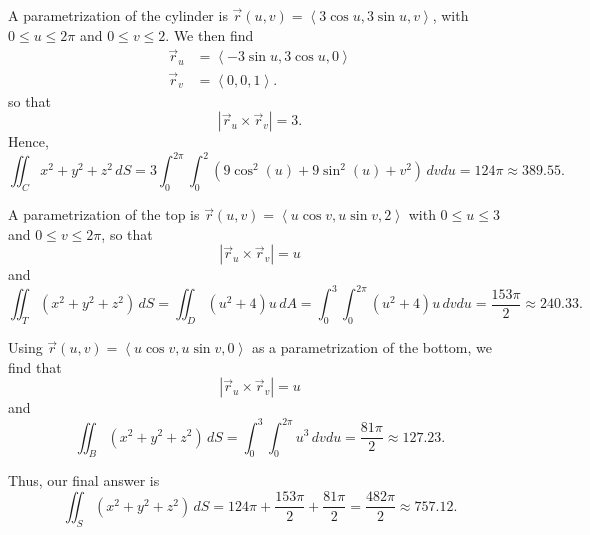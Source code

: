 \documentclass[12pt]{article}
\newcommand{\spc}{\vspace*{0.5cm}}
\begin{document}
	A parametrization of the cylinder is $\vec{r} (u, v ) = \left\langle 3 \cos u , 3 \sin u , v \right\rangle$, with $0 \leq u \leq 2\pi$ and $0 \leq v \leq 2$. We then find
		\begin{align*}
			\vec{r}_u &= \left\langle -3 \sin u , 3 \cos u , 0 \right\rangle \\ 
			\vec{r}_v &= \left\langle 0 , 0 , 1 \right\rangle .
		\end{align*}
	so that
		\[
			|\vec{r}_u \times \vec{r}_v | = 3 .
		\]
	Hence,
		\[
			\iint_C x^2 + y^2 + z^2 \, dS = 3 \int_0^{2\pi} \int_0^2 (9 \cos^2 (u) + 9 \sin^2 (u) + v^2 ) \, dv du = 124 \pi \approx 389.55 .
		\]

	A parametrization of the top is $\vec{r} (u, v) = \left\langle u \cos v , u \sin v , 2 \right\rangle$ with $0 \leq u \leq 3$ and $0 \leq v \leq 2\pi$, so that
		\[
			|\vec{r}_u \times \vec{r}_v| = u
		\]
	and
		\[
			\iint_T (x^2 + y^2 + z^2 ) \, dS = \iint_D (u^2 + 4) u \, dA = \int_0^3 \int_0^{2\pi} (u^2 + 4) u \, dv du = \frac{153 \pi}{2} \approx 240.33 .
		\]

	Using $\vec{r} (u, v) = \left\langle u \cos v , u \sin v , 0 \right\rangle$ as a parametrization of the bottom, we find that
		\[
			|\vec{r}_u \times \vec{r}_v | = u
		\]
	and
		\[
			\iint_B (x^2 + y^2 + z^2 ) \, dS = \int_0^3 \int_0^{2\pi} u^3 \, dv du = \frac{81 \pi}{2} \approx 127.23 .
		\]

	Thus, our final answer is
		\[
			\iint_S (x^2 + y^2 + z^2 ) \, dS = 124 \pi + \frac{153 \pi}{2} + \frac{81 \pi}{2} = \frac{482 \pi}{2} \approx 757.12 .
		\]

	\spc 
\end{document}
